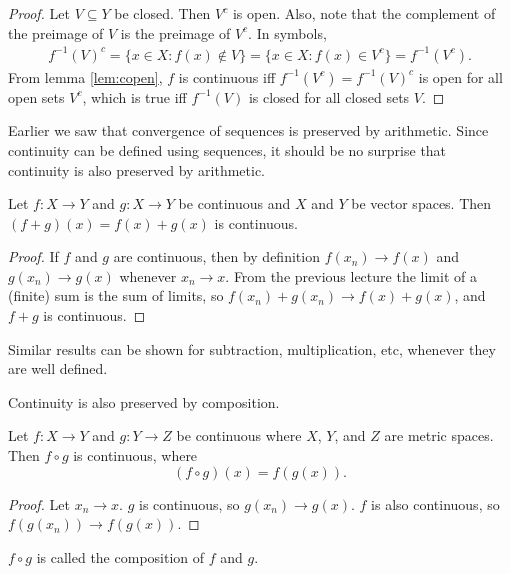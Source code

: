\begin{proof}
  Let $V \subseteq Y$ be closed. Then $V^c$ is open. Also, note that
  the complement of the preimage of $V$ is the preimage of $V^c$. In
  symbols,
  \begin{align*}
    f^{-1}(V)^c = \{x \in X: f(x) \not\in V \} = \{x \in X: f(x) \in V^c
    \} = f^{-1}(V^c).
  \end{align*}
  From lemma \ref{lem:copen}, $f$ is continuous iff $f^{-1}(V^c) =
  f^{-1}(V)^c$ is open for all open sets $V^c$, which is true iff
  $f^{-1}(V)$ is closed for all closed sets $V$.
\end{proof}

Earlier we saw that convergence of sequences is preserved by
arithmetic. Since continuity can be defined using sequences, it should
be no surprise that continuity is also preserved by arithmetic.
\begin{theorem}
  Let $f:X \to Y$ and $g:X \to Y$ be continuous and $X$ and $Y$ be
  vector spaces. Then $(f+g)(x) = f(x) + g(x)$ is continuous.
\end{theorem}
\begin{proof}
  If $f$ and $g$ are continuous, then by definition $f(x_n) \to f(x)$
  and $g(x_n) \to g(x)$ whenever $x_n \to x$. From the previous
  lecture the limit of a (finite) sum is the sum of limits, so 
  $f(x_n) + g(x_n) \to f(x) + g(x)$, and $f+g$ is continuous.
\end{proof}
Similar results can be shown for subtraction, multiplication, etc,
whenever they are well defined. 

Continuity is also preserved by composition.
\begin{theorem}
  Let $f:X \to Y$ and $g:Y \to Z$ be continuous where $X$, $Y$, and
  $Z$ are metric spaces. Then $f \circ g$ is continuous, where
  \[ (f \circ g)(x) = f(g(x)). \]
\end{theorem}  
\begin{proof}
  Let $x_n \to x$. $g$ is continuous, so $g(x_n) \to g(x)$. $f$ is
  also continuous, so $f(g(x_n)) \to f(g(x))$.
\end{proof}
$f\circ g$ is called the composition of $f$ and $g$.

